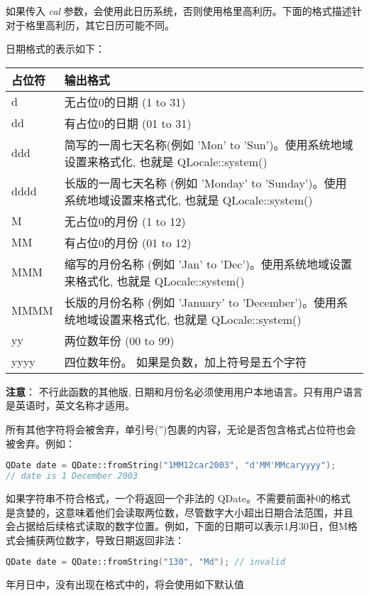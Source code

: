 如果传入 \emph{cal} 参数，会使用此日历系统，否则使用格里高利历。下面的格式描述针对于格里高利历，其它日历可能不同。

日期格式的表示如下：

\begin{tabular}{|l|l|}
\hline
占位符&	输出格式\\
\hline
d&	无占位0的日期 (1 to 31)\\
\hline
dd&	有占位0的日期 (01 to 31)\\
\hline
ddd&	简写的一周七天名称(例如 'Mon' to 'Sun')。使用系统地域设置来格式化, 也就是 QLocale::system()\\
\hline
dddd&	长版的一周七天名称 (例如 'Monday' to 'Sunday')。使用系统地域设置来格式化, 也就是 QLocale::system()\\
\hline
M&	无占位0的月份 (1 to 12)\\
\hline
MM&	有占位0的月份 (01 to 12)\\
\hline
MMM&	缩写的月份名称 (例如 'Jan' to 'Dec')。使用系统地域设置来格式化, 也就是 QLocale::system()\\
\hline
MMMM&	长版的月份名称 (例如 'January' to 'December')。使用系统地域设置来格式化, 也就是 QLocale::system()\\
\hline
yy&	两位数年份 (00 to 99)\\
\hline
yyyy&	四位数年份。 如果是负数，加上符号是五个字符\\
\hline
\end{tabular}

\textbf{注意}： 不行此函数的其他版, 日期和月份名必须使用用户本地语言。只有用户语言是英语时，英文名称才适用。

所有其他字符将会被舍弃，单引号('')包裹的内容，无论是否包含格式占位符也会被舍弃。例如：

\begin{lstlisting}[language=C++]
QDate date = QDate::fromString("1MM12car2003", "d'MM'MMcaryyyy");
// date is 1 December 2003
\end{lstlisting}

如果字符串不符合格式，一个将返回一个非法的 QDate。不需要前面补0的格式
是贪婪的，这意味着他们会读取两位数，尽管数字大小超出日期合法范围，并且
会占据给后续格式读取的数字位置。例如，下面的日期可以表示1月30日，但M格
式会捕获两位数字，导致日期返回非法：

\begin{lstlisting}[language=C++]
QDate date = QDate::fromString("130", "Md"); // invalid
\end{lstlisting}

年月日中，没有出现在格式中的，将会使用如下默认值

